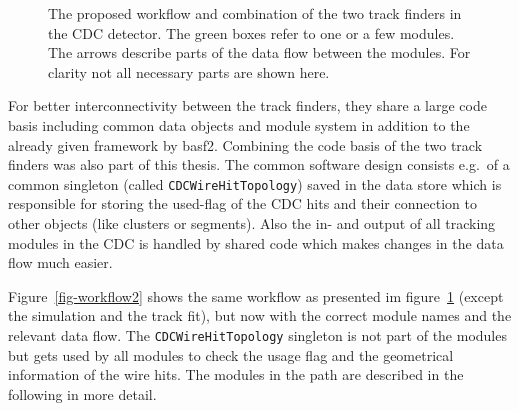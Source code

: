 \begin{figure}
  \centering
 \caption[Proposed workflow in the CDC tracking]{The proposed workflow and combination of the two track finders in the CDC detector. The green boxes refer to one or a few modules. The arrows describe parts of the data flow between the modules. For clarity not all necessary parts are shown here.}
 \label{fig-workflow}
\end{figure}

For better interconnectivity between the track finders, they share a large code basis including common data objects and module system in addition to the already given framework by basf2. Combining the code basis of the two track finders was also part of this thesis. The common software design consists e.g.\ of a common singleton (called \texttt{CDCWireHitTopology}) saved in the data store which is responsible for storing the used-flag of the CDC hits and their connection to other objects (like clusters or segments). Also the in- and output of all tracking modules in the CDC is handled by shared code which makes changes in the data flow much easier.

Figure~\ref{fig-workflow2} shows the same workflow as presented im figure~\ref{fig-workflow} (except the simulation and the track fit), but now with the correct module names and the relevant data flow. The \texttt{CDCWireHitTopology} singleton is not part of the modules but gets used by all modules to check the usage flag and the geometrical information of the wire hits. The modules in the path are described in the following in more detail.


